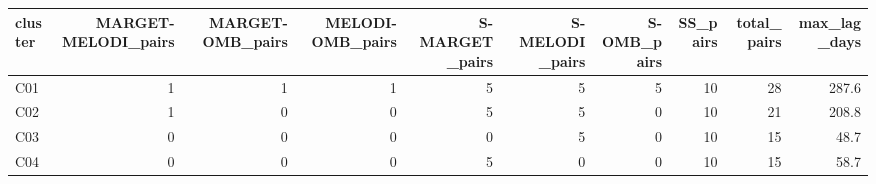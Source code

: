 \begin{tabular}{lrrrrrrrrr}
\toprule
cluster & MARGET-MELODI_pairs & MARGET-OMB_pairs & MELODI-OMB_pairs & S-MARGET_pairs & S-MELODI_pairs & S-OMB_pairs & SS_pairs & total_pairs & max_lag_days \\
\midrule
C01 & 1 & 1 & 1 & 5 & 5 & 5 & 10 & 28 & 287.6 \\
C02 & 1 & 0 & 0 & 5 & 5 & 0 & 10 & 21 & 208.8 \\
C03 & 0 & 0 & 0 & 0 & 5 & 0 & 10 & 15 & 48.7 \\
C04 & 0 & 0 & 0 & 5 & 0 & 0 & 10 & 15 & 58.7 \\
\bottomrule
\end{tabular}
